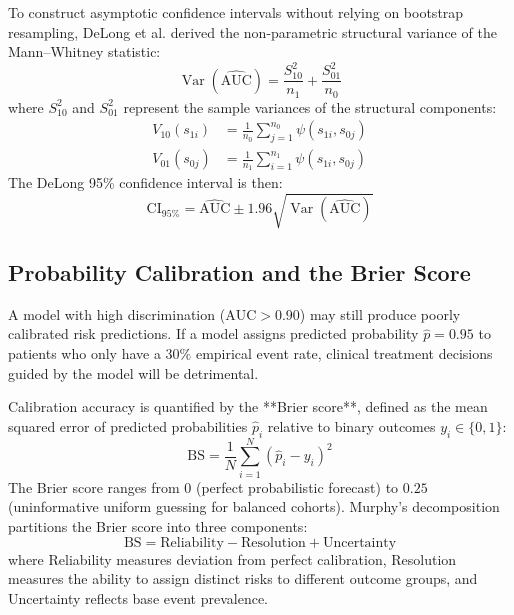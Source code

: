 \documentclass[11pt,twoside,openright]{book}
\begin{document}
To construct asymptotic confidence intervals without relying on bootstrap resampling, DeLong et al. \cite{delong1988comparing} derived the non-parametric structural variance of the Mann--Whitney statistic:
\begin{equation}
\operatorname{Var}(\widehat{\text{AUC}}) = \frac{S_{10}^2}{n_1} + \frac{S_{01}^2}{n_0}
\label{eq:delong_var}
\end{equation}
where $S_{10}^2$ and $S_{01}^2$ represent the sample variances of the structural components:
\begin{align}
V_{10}(s_{1i}) &= \frac{1}{n_0} \sum_{j=1}^{n_0} \psi(s_{1i}, s_{0j}) \\
V_{01}(s_{0j}) &= \frac{1}{n_1} \sum_{i=1}^{n_1} \psi(s_{1i}, s_{0j})
\end{align}
The DeLong 95\% confidence interval is then:
\begin{equation}
\text{CI}_{95\%} = \widehat{\text{AUC}} \pm 1.96 \sqrt{\operatorname{Var}(\widehat{\text{AUC}})}
\end{equation}

\subsection{Probability Calibration and the Brier Score}

A model with high discrimination ($\text{AUC} > 0.90$) may still produce poorly calibrated risk predictions. If a model assigns predicted probability $\hat{p} = 0.95$ to patients who only have a $30\%$ empirical event rate, clinical treatment decisions guided by the model will be detrimental.

Calibration accuracy is quantified by the **Brier score**, defined as the mean squared error of predicted probabilities $\hat{p}_i$ relative to binary outcomes $y_i \in \{0, 1\}$:
\begin{equation}
\text{BS} = \frac{1}{N} \sum_{i=1}^{N} (\hat{p}_i - y_i)^2
\label{eq:brier_score}
\end{equation}
The Brier score ranges from $0$ (perfect probabilistic forecast) to $0.25$ (uninformative uniform guessing for balanced cohorts). Murphy's decomposition partitions the Brier score into three components:
\begin{equation}
\text{BS} = \text{Reliability} - \text{Resolution} + \text{Uncertainty}
\end{equation}
where Reliability measures deviation from perfect calibration, Resolution measures the ability to assign distinct risks to different outcome groups, and Uncertainty reflects base event prevalence.
\end{document}
